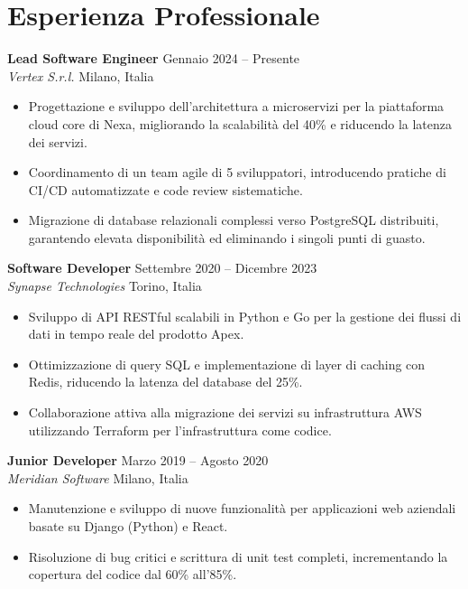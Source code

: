 \documentclass[10pt,a4paper]{article}
\newcommand{\experienceitem}[4]{
  \noindent\textbf{#1} \hfill {\color{lighttext}\small #2} \\
  \noindent\textit{#3} \hfill {\color{lighttext}\small #4} \\
  \vspace{0.2em}
}
\begin{document}
\begin{minipage}[t]{0.62\textwidth}
  \section*{Esperienza Professionale}
  
  \experienceitem{Lead Software Engineer}{Gennaio 2024 -- Presente}{Vertex S.r.l.}{Milano, Italia}
  \begin{itemize}
    \item Progettazione e sviluppo dell'architettura a microservizi per la piattaforma cloud core di Nexa, migliorando la scalabilità del 40\% e riducendo la latenza dei servizi.
    \item Coordinamento di un team agile di 5 sviluppatori, introducendo pratiche di CI/CD automatizzate e code review sistematiche.
    \item Migrazione di database relazionali complessi verso PostgreSQL distribuiti, garantendo elevata disponibilità ed eliminando i singoli punti di guasto.
  \end{itemize}
  
  \vspace{0.8em}
  
  \experienceitem{Software Developer}{Settembre 2020 -- Dicembre 2023}{Synapse Technologies}{Torino, Italia}
  \begin{itemize}
    \item Sviluppo di API RESTful scalabili in Python e Go per la gestione dei flussi di dati in tempo reale del prodotto Apex.
    \item Ottimizzazione di query SQL e implementazione di layer di caching con Redis, riducendo la latenza del database del 25\%.
    \item Collaborazione attiva alla migrazione dei servizi su infrastruttura AWS utilizzando Terraform per l'infrastruttura come codice.
  \end{itemize}
  
  \vspace{0.8em}
  
  \experienceitem{Junior Developer}{Marzo 2019 -- Agosto 2020}{Meridian Software}{Milano, Italia}
  \begin{itemize}
    \item Manutenzione e sviluppo di nuove funzionalità per applicazioni web aziendali basate su Django (Python) e React.
    \item Risoluzione di bug critici e scrittura di unit test completi, incrementando la copertura del codice dal 60\% all'85\%.
  \end{itemize}
  

\end{minipage}
\end{document}

